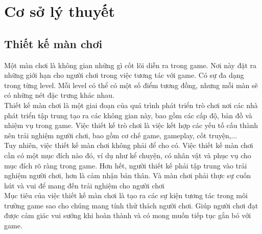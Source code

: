 \section{Cơ sở lý thuyết}
\subsection{Thiết kế màn chơi}
\hspace*{1cm} Một màn chơi là không gian những gì cốt lõi diễn ra trong game. Nơi này đặt ra những giới hạn cho người chơi trong việc tương tác với game. Có sự đa dạng trong từng level. Mỗi level có thể có một số điểm tương đồng, nhưng mỗi màn sẽ có những nét đặc trưng khác nhau.\\
\hspace*{1cm} Thiết kế màn chơi là một giai đoạn của quá trình phát triển trò chơi nơi các nhà phát triển tập trung tạo ra các không gian này, bao gồm các cấp độ, bản đồ và nhiệm vụ trong game. Việc thiết kế trò chơi là việc kết hợp các yếu tố cấu thành nên trải nghiệm người chơi, bao gồm cơ chế game, gameplay, cốt truyện,...\\
\hspace*{1cm} Tuy nhiên, việc thiết kế màn chơi không phải để cho có. Việc thiết kế màn chơi cần có một mục đích nào đó, ví dụ như kể chuyện, có nhân vật và phục vụ cho mục đích rõ ràng trong game. Hơn hết, người thiết kế phải tập trung vào trải nghiệm người chơi, hơn là cảm nhận bản thân. Và màn chơi phải thực sự cuốn hút và vui để mang đến trải nghiệm cho người chơi\\
\hspace*{1cm} Mục tiêu của việc thiết kế màn chơi là tạo ra các sự kiện tương tác trong môi trường game sao cho chúng mang tính thử thách người chơi. Giúp người chơi đạt được cảm giác vui sướng khi hoàn thành và có mong muốn tiếp tục gắn bó với game.\\
